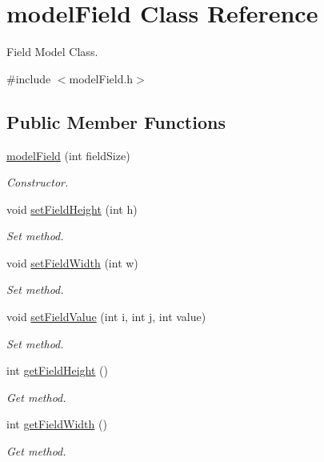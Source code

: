 \hypertarget{classmodelField}{\section{model\+Field Class Reference}
\label{classmodelField}
}


Field Model Class.  




{\ttfamily \#include $<$model\+Field.\+h$>$}

\subsection*{Public Member Functions}
\begin{DoxyCompactItemize}
\item 
\hyperlink{classmodelField_acb891bc142ced08527b1c69a07aadfdd}{model\+Field} (int field\+Size)
\begin{DoxyCompactList}\small\item\em Constructor. \end{DoxyCompactList}\item 
void \hyperlink{classmodelField_aa7a9a0bdcdde1b1094c124bc5fb79bfd}{set\+Field\+Height} (int h)
\begin{DoxyCompactList}\small\item\em Set method. \end{DoxyCompactList}\item 
void \hyperlink{classmodelField_a4c98f1aa49ab32c13f34d35e549d4c2a}{set\+Field\+Width} (int w)
\begin{DoxyCompactList}\small\item\em Set method. \end{DoxyCompactList}\item 
void \hyperlink{classmodelField_af01f0d0cf3f340d293a624590a40c997}{set\+Field\+Value} (int i, int j, int value)
\begin{DoxyCompactList}\small\item\em Set method. \end{DoxyCompactList}\item 
int \hyperlink{classmodelField_a6408e088bb2917f014df500d43695ff1}{get\+Field\+Height} ()
\begin{DoxyCompactList}\small\item\em Get method. \end{DoxyCompactList}\item 
int \hyperlink{classmodelField_acb6e92b1c2df95a6f072f0f7bf323d9c}{get\+Field\+Width} ()
\begin{DoxyCompactList}\small\item\em Get method. \end{DoxyCompactList}\item 

\end{DoxyCompactItemize}
